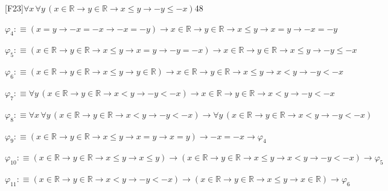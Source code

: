\begin{fullproof}{[F23]}{$\forall x\,\forall y\,(x \in \mathbb{R} \to y \in \mathbb{R} \to x \leq y \to -y \leq -x)$}{48}
\begin{abbrevlist}
\item $\varphi_{4} :\equiv (x = y \to -x = -x \to -x = -y) \to x \in \mathbb{R} \to y \in \mathbb{R} \to x \leq y \to x = y \to -x = -y$
\item $\varphi_{5} :\equiv (x \in \mathbb{R} \to y \in \mathbb{R} \to x \leq y \to x = y \to -y = -x) \to x \in \mathbb{R} \to y \in \mathbb{R} \to x \leq y \to -y \leq -x$
\item $\varphi_{6} :\equiv (x \in \mathbb{R} \to y \in \mathbb{R} \to x \leq y \to y \in \mathbb{R}) \to x \in \mathbb{R} \to y \in \mathbb{R} \to x \leq y \to x < y \to -y < -x$
\item $\varphi_{7} :\equiv \forall y\,(x \in \mathbb{R} \to y \in \mathbb{R} \to x < y \to -y < -x) \to x \in \mathbb{R} \to y \in \mathbb{R} \to x < y \to -y < -x$
\item $\varphi_{8} :\equiv \forall x\,\forall y\,(x \in \mathbb{R} \to y \in \mathbb{R} \to x < y \to -y < -x) \to \forall y\,(x \in \mathbb{R} \to y \in \mathbb{R} \to x < y \to -y < -x)$
\item $\varphi_{9} :\equiv (x \in \mathbb{R} \to y \in \mathbb{R} \to x \leq y \to x = y \to x = y) \to -x = -x \to \varphi_{4}$
\item $\varphi_{10} :\equiv (x \in \mathbb{R} \to y \in \mathbb{R} \to x \leq y \to x \leq y) \to (x \in \mathbb{R} \to y \in \mathbb{R} \to x \leq y \to x < y \to -y < -x) \to \varphi_{5}$
\item $\varphi_{11} :\equiv (x \in \mathbb{R} \to y \in \mathbb{R} \to x < y \to -y < -x) \to (x \in \mathbb{R} \to y \in \mathbb{R} \to x \leq y \to x \in \mathbb{R}) \to \varphi_{6}$
\end{abbrevlist}
\end{fullproof}

